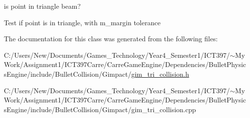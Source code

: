is point in triangle beam? 

Test if point is in triangle, with m\_\-margin tolerance 

The documentation for this class was generated from the following files:\begin{CompactItemize}
\item 
C:/Users/New/Documents/Games\_\-Technology/Year4\_\-Semester1/ICT397/$\sim$My Work/Assignment1/ICT397Carre/CarreGameEngine/Dependencies/BulletPhysicsEngine/include/BulletCollision/Gimpact/\hyperlink{gim__tri__collision_8h}{gim\_\-tri\_\-collision.h}\item 
C:/Users/New/Documents/Games\_\-Technology/Year4\_\-Semester1/ICT397/$\sim$My Work/Assignment1/ICT397Carre/CarreGameEngine/Dependencies/BulletPhysicsEngine/include/BulletCollision/Gimpact/gim\_\-tri\_\-collision.cpp\end{CompactItemize}
